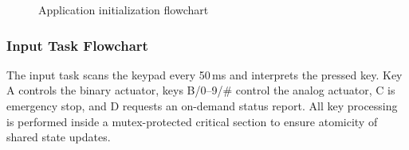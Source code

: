 \begin{figure}[H]
\centering
{}
\caption{Application initialization flowchart}
\label{fig:app_init_flowchart}
\end{figure}

\subsubsection{Input Task Flowchart}

The input task scans the keypad every 50\,ms and interprets the pressed key. Key A controls the binary actuator, keys B/0--9/\# control the analog actuator, C is emergency stop, and D requests an on-demand status report. All key processing is performed inside a mutex-protected critical section to ensure atomicity of shared state updates.

